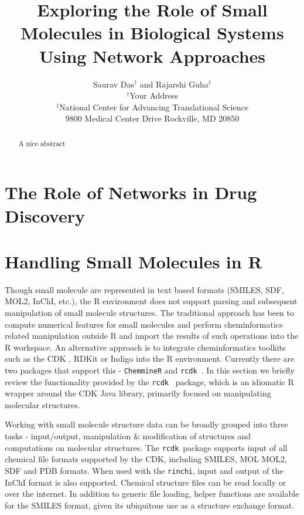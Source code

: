 \documentclass[12pt,letterpaper]{article}
\newcommand{\rcdk}{\texttt{rcdk}\ }
\begin{document}
\title{Exploring the Role of Small Molecules in Biological Systems Using Network Approaches}
\author{Saurav Das$^\dagger$ and Rajarshi Guha$^\ddagger$\\
$^\dagger$Your Address \\
$^\ddagger$National Center for Advancing Translational Science \\ 9800 Medical Center Drive  Rockville, MD 20850}
\date{}

\maketitle
\begin{abstract}
A nice abstract
\end{abstract}

\section{The Role of Networks in Drug Discovery}
\label{sec:role-networks-drug}

\section{Handling Small Molecules in R}
\label{sec:handl-small-molec}

Though small molecule are represented in text based formats (SMILES,
SDF, MOL2, InChI, etc.), the R environment does not support parsing
and subsequent manipulation of small molecule structures. The
traditional approach has been to compute numerical features for small
molecules and perform cheminformatics related manipulation outside R
and import the results of such operations into the R workspace. An
alternative approach is to integrate cheminformatics toolkits such as
the CDK \cite{Steinbeck:2003bh}, RDKit or Indigo into the R
environment. Currently there are two packages that support this -
\texttt{ChemmineR} \cite{Cao:2008fj} and \rcdk \cite{Guha:2007aa}. In this
section we briefly review the functionality provided by the \rcdk
package, which is an idiomatic R wrapper around the CDK Java library,
primarily focused on manipulating molecular structures.

Working with small molecule structure data can be broadly grouped into
three tasks - input/output, manipulation \& modification of structures
and computations on molecular structures. The \rcdk package supports
input of all chemical file formats supported by the CDK, including
SMILES, MOL MOL2, SDF and PDB formats. When used with the
\texttt{rinchi}, input and output of the InChI format is also
supported. Chemical structure files can be read locally or over the
internet. In addition to generic file loading, helper functions are
available for the SMILES format, given its ubiquitous use as a
structure exchange format.
\end{document}
